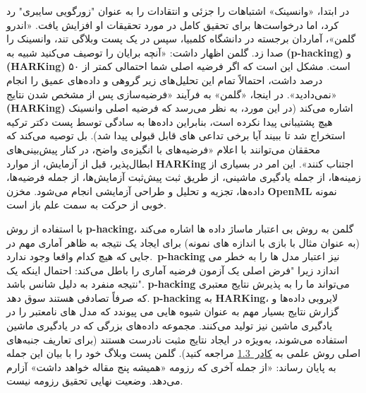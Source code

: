 در ابتدا، «وانسینک» اشتباهات را جزئی و انتقادات را به عنوان "زورگویی سایبری" رد کرد، اما درخواست‌ها برای تحقیق کامل در مورد تحقیقات او افزایش یافت.
«اندرو گلمن»، آماردان برجسته در دانشگاه کلمبیا، سپس در یک پست وبلاگی تند، وانسینک را صدا زد.
گلمن اظهار داشت: «آنچه برایان را توصیف می‌کنید شبیه به \textenglish{\textbf{(p-hacking)}} و \textenglish{\textbf{(HARKing)}} است.
مشکل این است که اگر فرضیه اصلی شما احتمالی کمتر از ۵۰ درصد داشت، احتمالاً تمام این تحلیل‌های زیر گروهی و داده‌های عمیق را انجام نمی‌دادید».
در اینجا، «گلمن» به فرآیند «فرضیه‌سازی پس از مشخص شدن نتایج» \textenglish{\textbf{(HARKing)}} اشاره می‌کند (در این مورد، به نظر می‌رسد که فرضیه اصلی وانسینک هیچ پشتیبانی پیدا نکرده است، بنابراین داده‌ها به سادگی توسط پست دکتر ترکیه استخراج شد تا ببیند آیا برخی تداعی های قابل قبولی پیدا شد).
بل توصیه می‌کند که محققان می‌توانند با اعلام «فرضیه‌های با انگیزه‌ی واضح، در کنار پیش‌بینی‌های ابطال‌پذیر، قبل از آزمایش، از موارد \textenglish{\textbf{HARKing}} اجتناب کنند».
این امر در بسیاری از زمینه‌ها، از جمله یادگیری ماشینی، از طریق ثبت پیش‌ثبت آزمایش‌ها، از جمله فرضیه‌ها، داده‌ها، تجزیه و تحلیل و طراحی آزمایشی انجام می‌شود.
مخزن \textenglish{\textbf{OpenML}} نمونه خوبی از حرکت به سمت علم باز است.

با استفاده از روش \textenglish{\textbf{p-hacking}}، گلمن به روش بی اعتبار ماساژ داده ها اشاره می‌کند (به عنوان مثال با بازی با اندازه های نمونه) برای ایجاد یک نتیجه به ظاهر آماری مهم در جایی که هیچ کدام واقعا وجود ندارد.\ \textenglish{\textbf{p-hacking}} نیز اعتبار مدل ها را به خطر می اندازد زیرا "فرض اصلی یک آزمون فرضیه آماری را باطل می‌کند: احتمال اینکه یک نتیجه منفرد به دلیل شانس باشد".
\mbox{\textenglish{\textbf{p-hacking}}} می‌تواند ما را به پذیرش نتایج معتبری که صرفاً تصادفی هستند سوق دهد.
\textenglish{\textbf{p-hacking}} به \textenglish{\textbf{HARKing}}، لایروبی داده‌ها و گزارش نتایج بسیار مهم به عنوان شیوه هایی می پیوندد که مدل های نامعتبر را در یادگیری ماشین نیز تولید می‌کنند.
مجموعه داده‌های بزرگی که در یادگیری ماشین استفاده می‌شوند، به‌ویژه در ایجاد نتایج مثبت نادرست هستند (برای تعاریف جنبه‌های اصلی روش علمی به \hyperref[sec:جعبه 1.3]{\mbox{کادر 1.3}} مراجعه کنید).
گلمن پست وبلاگ خود را با بیان این جمله به پایان رساند: «از جمله آخری که رزومه «همیشه پنج مقاله خواهد داشت» آزارم می‌دهد.
وضعیت نهایی تحقیق رزومه نیست.



